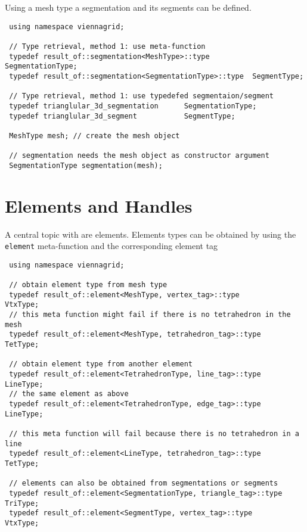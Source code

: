 Using a mesh type a segmentation and its segments can be defined.

\begin{lstlisting}
 using namespace viennagrid;
 
 // Type retrieval, method 1: use meta-function
 typedef result_of::segmentation<MeshType>::type        SegmentationType;
 typedef result_of::segmentation<SegmentationType>::type  SegmentType;
 
 // Type retrieval, method 1: use typedefed segmentaion/segment
 typedef trianglular_3d_segmentation      SegmentationType;
 typedef trianglular_3d_segment           SegmentType;

 MeshType mesh; // create the mesh object
 
 // segmentation needs the mesh object as constructor argument
 SegmentationType segmentation(mesh);
\end{lstlisting}

\pagebreak

\section{Elements and Handles} \label{sec:elements-and-handles}

A central topic with {\ViennaGrid} are elements. Elements types can be obtained by using the \lstinline|element| meta-function and the corresponding element tag

\begin{lstlisting}
 using namespace viennagrid;
 
 // obtain element type from mesh type
 typedef result_of::element<MeshType, vertex_tag>::type         VtxType;
 // this meta function might fail if there is no tetrahedron in the mesh
 typedef result_of::element<MeshType, tetrahedron_tag>::type    TetType;
 
 // obtain element type from another element
 typedef result_of::element<TetrahedronType, line_tag>::type      LineType;
 // the same element as above
 typedef result_of::element<TetrahedronType, edge_tag>::type      LineType;
 
 // this meta function will fail because there is no tetrahedron in a line
 typedef result_of::element<LineType, tetrahedron_tag>::type      TetType;
 
 // elements can also be obtained from segmentations or segments
 typedef result_of::element<SegmentationType, triangle_tag>::type TriType;
 typedef result_of::element<SegmentType, vertex_tag>::type        VtxType;
\end{lstlisting}

